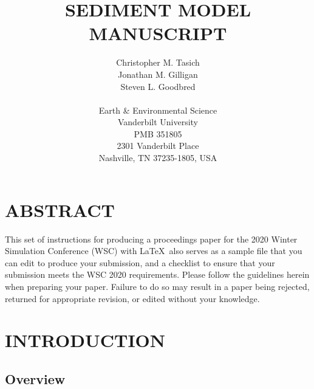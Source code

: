 \documentclass{wscpaperproc}
\theoremstyle{wsc}
\begin{document}
%
%

\title{SEDIMENT MODEL MANUSCRIPT}

\author{Christopher M. Tasich \\
Jonathan M. Gilligan \\
Steven L. Goodbred \\
\vspace{12pt} \\
Earth \& Environmental Science \\
Vanderbilt University \\
PMB 351805 \\
2301 Vanderbilt Place  \\
Nashville, TN 37235-1805, USA
}



\maketitle

\section*{ABSTRACT}
This set of instructions for producing a proceedings paper for the 2020 Winter Simulation Conference (WSC) with \LaTeX\ also serves as a sample file that you can edit to produce your submission, and a checklist to ensure that your submission meets the WSC 2020 requirements. Please follow the guidelines herein when preparing your paper. Failure to do so may result in a paper being rejected, returned for appropriate revision, or edited without your knowledge.

\section{INTRODUCTION}

\subsection{Overview}
\end{document}
